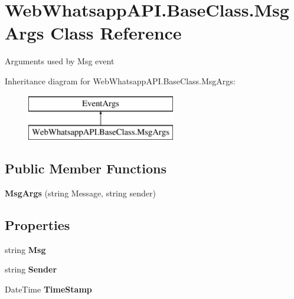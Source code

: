 \hypertarget{class_web_whatsapp_a_p_i_1_1_base_class_1_1_msg_args}{}\section{Web\+Whatsapp\+A\+P\+I.\+Base\+Class.\+Msg\+Args Class Reference}
\label{class_web_whatsapp_a_p_i_1_1_base_class_1_1_msg_args}


Arguments used by Msg event  


Inheritance diagram for Web\+Whatsapp\+A\+P\+I.\+Base\+Class.\+Msg\+Args\+:\begin{figure}[H]
\begin{center}
\leavevmode
\includegraphics[height=2.000000cm]{class_web_whatsapp_a_p_i_1_1_base_class_1_1_msg_args}
\end{center}
\end{figure}
\subsection*{Public Member Functions}
\begin{DoxyCompactItemize}
\item 
\mbox{\label{class_web_whatsapp_a_p_i_1_1_base_class_1_1_msg_args_aa15211e46707530747a91bb640791c3f}} 
{\bfseries Msg\+Args} (string Message, string sender)
\end{DoxyCompactItemize}
\subsection*{Properties}
\begin{DoxyCompactItemize}
\item 
\mbox{\label{class_web_whatsapp_a_p_i_1_1_base_class_1_1_msg_args_ad8b630e6df6ba85242a2f91316c71737}} 
string {\bfseries Msg}
\item 
\mbox{\label{class_web_whatsapp_a_p_i_1_1_base_class_1_1_msg_args_a9086dcdc39b06fde7c1b4b3dda710cfd}} 
string {\bfseries Sender}
\item 
\mbox{\label{class_web_whatsapp_a_p_i_1_1_base_class_1_1_msg_args_a3472dea941c91796a7ddce1ac3f73864}} 
Date\+Time {\bfseries Time\+Stamp}
\end{DoxyCompactItemize}


